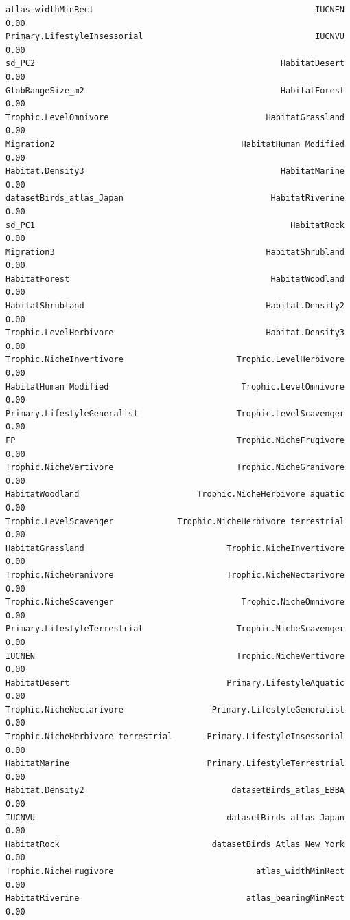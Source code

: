 \documentclass[
  letterpaper,
  DIV=11,
  numbers=noendperiod]{scrreprt}
\begin{document}
\begin{verbatim}
atlas_widthMinRect                                             IUCNEN    0.00
Primary.LifestyleInsessorial                                   IUCNVU    0.00
sd_PC2                                                  HabitatDesert    0.00
GlobRangeSize_m2                                        HabitatForest    0.00
Trophic.LevelOmnivore                                HabitatGrassland    0.00
Migration2                                      HabitatHuman Modified    0.00
Habitat.Density3                                        HabitatMarine    0.00
datasetBirds_atlas_Japan                              HabitatRiverine    0.00
sd_PC1                                                    HabitatRock    0.00
Migration3                                           HabitatShrubland    0.00
HabitatForest                                         HabitatWoodland    0.00
HabitatShrubland                                     Habitat.Density2    0.00
Trophic.LevelHerbivore                               Habitat.Density3    0.00
Trophic.NicheInvertivore                       Trophic.LevelHerbivore    0.00
HabitatHuman Modified                           Trophic.LevelOmnivore    0.00
Primary.LifestyleGeneralist                    Trophic.LevelScavenger    0.00
FP                                             Trophic.NicheFrugivore    0.00
Trophic.NicheVertivore                         Trophic.NicheGranivore    0.00
HabitatWoodland                        Trophic.NicheHerbivore aquatic    0.00
Trophic.LevelScavenger             Trophic.NicheHerbivore terrestrial    0.00
HabitatGrassland                             Trophic.NicheInvertivore    0.00
Trophic.NicheGranivore                       Trophic.NicheNectarivore    0.00
Trophic.NicheScavenger                          Trophic.NicheOmnivore    0.00
Primary.LifestyleTerrestrial                   Trophic.NicheScavenger    0.00
IUCNEN                                         Trophic.NicheVertivore    0.00
HabitatDesert                                Primary.LifestyleAquatic    0.00
Trophic.NicheNectarivore                  Primary.LifestyleGeneralist    0.00
Trophic.NicheHerbivore terrestrial       Primary.LifestyleInsessorial    0.00
HabitatMarine                            Primary.LifestyleTerrestrial    0.00
Habitat.Density2                              datasetBirds_atlas_EBBA    0.00
IUCNVU                                       datasetBirds_atlas_Japan    0.00
HabitatRock                               datasetBirds_Atlas_New_York    0.00
Trophic.NicheFrugivore                             atlas_widthMinRect    0.00
HabitatRiverine                                  atlas_bearingMinRect    0.00

\end{verbatim}
\end{document}
